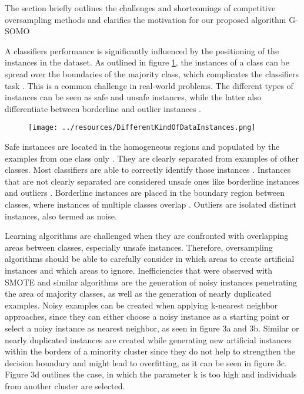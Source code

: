 \documentclass[parskip=full]{scrartcl}
\begin{document}
The section briefly outlines the challenges and shortcomings of competitive oversampling methods and clarifies the motivation for our proposed algorithm G-SOMO

A classifiers performance is significantly influenced by the positioning of the instances in the dataset. As outlined in figure \ref{fig:Saez}, the instances of a class can be spread over the boundaries of the majority class, which complicates the classifiers task \cite{Tang}. This is a common challenge in real-world problems. The different types of instances can be seen as safe and unsafe instances, while the latter also differentiate between borderline and outlier instances \cite{Saez}.


\begin{figure}[H]
	\centering
	\texttt{[image: ../resources/DifferentKindOfDataInstances.png]}
	\label{fig:Saez}
\end{figure}

Safe instances are located in the homogeneous regions and populated by the examples from one class only \cite{rodriguez2012hybrid}. They are clearly separated from examples of other classes. Most classifiers are able to correctly identify those instances \cite{Prati2004B}. Instances that are not clearly separated are considered unsafe ones like borderline instances and outliers \cite{Kubat2000}. Borderline instances are placed in the boundary region between classes, where instances of multiple classes overlap \cite{Saez}. Outliers are isolated distinct instances, also termed as noise. 

Learning algorithms are challenged when they are confronted with overlapping areas between classes, especially unsafe instances. Therefore, oversampling algorithms should be able to carefully consider in which areas to create artificial instances and which areas to ignore. Inefficiencies that were observed with SMOTE and similar algorithms are the generation of noisy instances penetrating the area of majority classes, as well as the generation of nearly duplicated examples. Noisy examples can be created when applying k-nearest neighbor approaches, since they can either choose a noisy instance as a starting point or select a noisy instance as nearest neighbor, as seen in figure 3a and 3b. Similar or nearly duplicated instances are created while generating new artificial instances within the borders of a minority cluster since they do not help to strengthen the decision boundary and might lead to overfitting, as it can be seen in figure 3c. Figure 3d outlines the case, in which the parameter k is too high and individuals from another cluster are selected.
\end{document}
